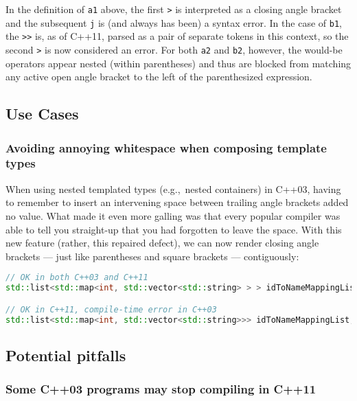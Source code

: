 \noindent In the definition of \texttt{a1} above, the first \texttt{>} is
interpreted as a closing angle bracket and the subsequent \texttt{j} is
(and always has been) a syntax error. In the case of \texttt{b1}, the
\texttt{>>} is, as of C++11, parsed as a pair of separate tokens in this
context, so the second \texttt{>} is now considered an error. For
both \texttt{a2} and \texttt{b2}, however, the would-be operators appear
nested (within parentheses) and thus are blocked from matching any
active open angle bracket to the left of the parenthesized expression.

\subsection[Use Cases]{Use Cases}\label{use-cases}

\subsubsection[Avoiding annoying whitespace when composing template types]{Avoiding annoying whitespace when composing template types}\label{avoiding-annoying-whitespace-when-composing-template-types}

When using nested templated types (e.g.,~nested containers) in C++03,
having to remember to insert an intervening space between trailing angle
brackets added no value. What made it even more galling was that every
popular compiler was able to tell you straight-up that you had forgotten
to leave the space. With this new
feature (rather, this repaired defect), we can now render closing angle
brackets --- just like parentheses and square brackets --- contiguously:

\begin{lstlisting}[language=C++]
// OK in both C++03 and C++11
std::list<std::map<int, std::vector<std::string> > > idToNameMappingList;

// OK in C++11, compile-time error in C++03
std::list<std::map<int, std::vector<std::string>>> idToNameMappingList;
\end{lstlisting}
    

\subsection[Potential pitfalls]{Potential pitfalls}\label{potential-pitfalls}

\subsubsection[Some C++03 programs may stop compiling in C++11]{Some C++03 programs may stop compiling in C++11}\label{some-c++03-programs-may-stop-working-in-c++11}

